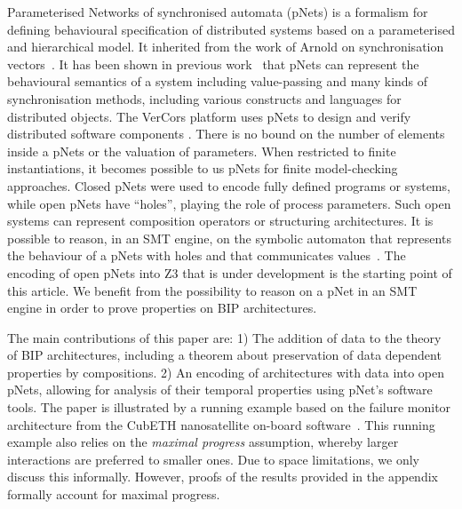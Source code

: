 \documentclass{llncs}
\newcommand{\Ludo}{\\\hfill\mdash Ludo}
\newcommand{\noteLH}[2][color=orange!40, size=\tiny]{\todo[#1]{{#2}\Ludo}}
\newcommand{\newCoord}[1]{{\color{blue}#1}}
\newcommand{\mdash}[1][]{---#1}
\begin{document}
Parameterised Networks of synchronised automata (pNets) is a formalism for defining behavioural specification of distributed systems based on a parameterised and hierarchical model.
It inherited from the work of
Arnold on synchronisation vectors~\cite{Arnold1982}. 
It has been shown in previous work~\cite{HMZ:PDP15} that pNets can  represent the behavioural semantics
of a system 
including value-passing and many kinds of synchronisation methods, including various constructs and
languages for distributed objects. The VerCors  platform uses pNets to design
and verify  distributed software components
\cite{CM:FMCO08,HKM-FASE16}. 
There is no bound on the number of elements inside a pNets or the valuation of parameters. When restricted to finite instantiations, it becomes possible to us pNets  for finite model-checking approaches.
Closed pNets were used to encode fully defined programs or systems,
while open pNets have ``holes'', playing the role of process
parameters. Such open systems can represent composition operators or structuring architectures.
It is possible to reason, in an SMT engine, on the symbolic automaton that represents the behaviour of a pNets with holes and that communicates values~\cite{HMZ-FORTE2016QBMZ-AVOCS18}. The encoding of open pNets into Z3 that is under development is the starting point of this article. We benefit from the possibility to reason on a pNet in an SMT engine in order to prove properties on BIP architectures.




The main contributions of this paper are: 1) \newCoord{The addition of data to the
theory of BIP architectures, including a theorem about
preservation of data dependent properties by 
compositions.} 2) An encoding of architectures with data into  open pNets, allowing for analysis of their temporal properties using pNet's
software tools.  
The  paper is illustrated by a running
example based on the failure monitor architecture from the CubETH
nanosatellite on-board software~\cite{CubETH-case-study}.
%
This running example also relies on the \emph{maximal progress}
assumption, whereby larger interactions are preferred to smaller
ones.  Due to space limitations, we only discuss this
informally. However, proofs of the results provided in the
appendix formally account for maximal progress.
\end{document}
